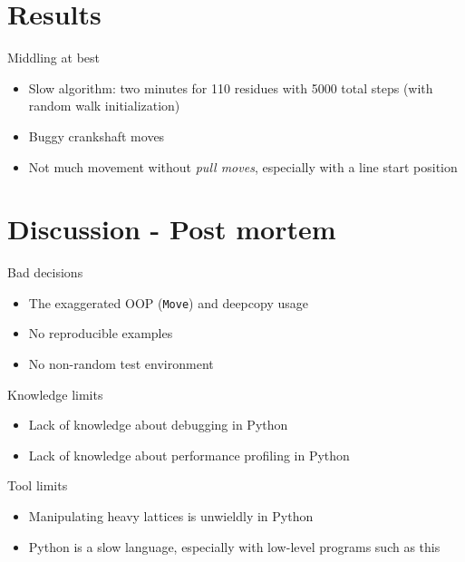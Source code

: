 \documentclass[presentation]{beamer}
\begin{document}
\section{Results}
\label{sec:org7f585e6}
\begin{frame}[label={sec:orgafcf54e}]{Middling at best}
\begin{itemize}
\item Slow algorithm: two minutes for 110 residues with 5000 total steps (with random walk initialization)
\pause
\item Buggy crankshaft moves
\pause
\item Not much movement without \emph{pull moves}, especially with a line start position
\end{itemize}
\end{frame}
\section{Discussion - Post mortem}
\label{sec:org1878883}
\begin{frame}[label={sec:org056020b},fragile]{Bad decisions}
 \begin{itemize}
\item The exaggerated OOP (\texttt{Move}) and deepcopy usage
\end{itemize}
\pause
\begin{itemize}
\item No reproducible examples
\end{itemize}
\pause
\begin{itemize}
\item No non-random test environment
\end{itemize}
\end{frame}


\begin{frame}[label={sec:org4540021}]{Knowledge limits}
\begin{itemize}
\item Lack of knowledge about debugging in Python
\pause
\item Lack of knowledge about performance profiling in Python
\end{itemize}
\end{frame}




\begin{frame}[label={sec:orgabe209f}]{Tool limits}
\begin{itemize}
\item Manipulating heavy lattices is unwieldly in Python
\end{itemize}
\pause
\begin{itemize}
\item Python is a slow language, especially with low-level programs such as this
\end{itemize}
\end{frame}
\end{document}
